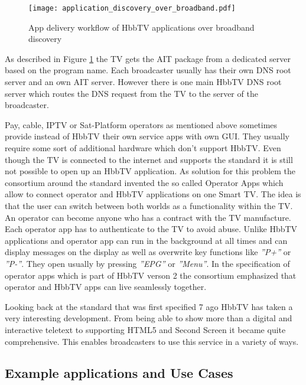 \begin{figure}[htb]
  \centering
  \texttt{[image: application\_discovery\_over\_broadband.pdf]}\\
  \caption{App delivery workflow of HbbTV applications over broadband discovery}\label{fig:application_discovery_over_broadband}
\end{figure}

As described in Figure \ref{fig:application_discovery_over_broadband} the TV gets the AIT package
from a dedicated server based on the program name. Each broadcaster usually has their own DNS
root server and an own AIT server. However there is one main HbbTV DNS root server which routes the
DNS request from the TV to the server of the broadcaster.

Pay, cable, IPTV or Sat-Platform operators as mentioned above sometimes provide instead of HbbTV
their own service apps with own GUI. They usually require some sort of additional hardware which
don't support HbbTV. Even though the TV is connected to the internet and supports the standard
it is still not possible to open up an HbbTV application. As solution for this problem the
consortium around the standard invented the so called Operator Apps which allow to connect
operator and HbbTV applications on one Smart TV. The idea is that the user can switch between
both worlds as a functionality within the TV. An operator can become anyone who has a contract
with the TV manufacture. Each operator app has to authenticate to the TV to avoid abuse. Unlike
HbbTV applications and operator app can run in the background at all times and can display
messages on the display as well as overwrite key functions like \textit{''P+''} or \textit{''P-''}.
They open usually by pressing \textit{''EPG''} or \textit{''Menu''}. In the specification of
operator apps which is part of HbbTV verson 2 the consortium emphasized that operator and HbbTV
apps can live seamlessly together.

Looking back at the standard that was first specified 7 ago HbbTV has taken a very interesting
development. From being able to show more than a digital and interactive teletext to supporting
HTML5 and Second Screen it became quite comprehensive. This enables broadcasters to use this
service in a variety of ways.

\subsection{Example applications and Use Cases}


